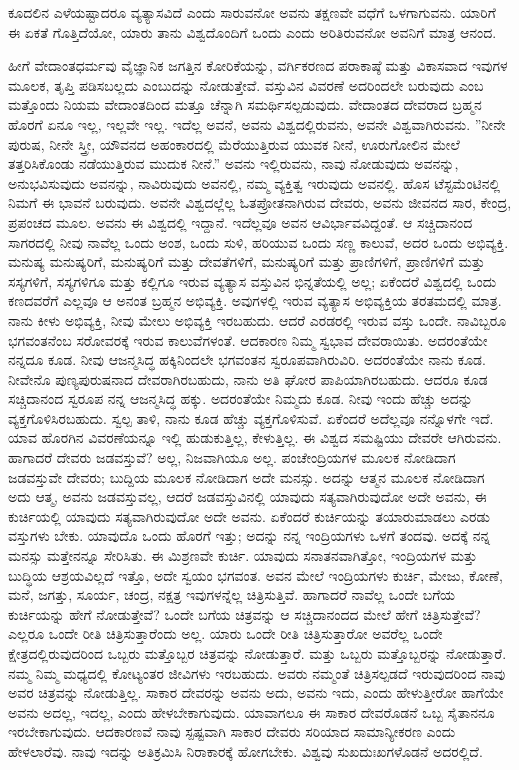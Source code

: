 ಕೂದಲಿನ ಎಳೆಯಷ್ಟಾದರೂ ವ್ಯತ್ಯಾಸವಿದೆ ಎಂದು ಸಾರುವನೋ ಅವನು ತಕ್ಷಣವೇ ವಧೆಗೆ ಒಳಗಾಗುವನು. ಯಾರಿಗೆ ಈ ಏಕತೆ ಗೊತ್ತಿದೆಯೋ, ಯಾರು ತಾನು ವಿಶ್ವದೊಂದಿಗೆ ಒಂದು ಎಂದು ಅರಿತಿರುವನೋ ಅವನಿಗೆ ಮಾತ್ರ ಆನಂದ.

ಹೀಗೆ ವೇದಾಂತಧರ್ಮವು ವೈಜ್ಞಾನಿಕ ಜಗತ್ತಿನ ಕೋರಿಕೆಯನ್ನು, ವರ್ಗಿಕರಣದ ಪರಾಕಾಷ್ಠೆ ಮತ್ತು ವಿಕಾಸವಾದ ಇವುಗಳ ಮೂಲಕ, ತೃಪ್ತಿ ಪಡಿಸಬಲ್ಲದು ಎಂಬುದನ್ನು ನೋಡುತ್ತೇವೆ. ವಸ್ತುವಿನ ವಿವರಣೆ ಅದರಿಂದಲೇ ಬರುವುದು ಎಂಬ ಮತ್ತೊಂದು ನಿಯಮ ವೇದಾಂತದಿಂದ ಮತ್ತೂ ಚೆನ್ನಾಗಿ ಸಮರ್ಥಿಸಲ್ಪಡುವುದು. ವೇದಾಂತದ ದೇವರಾದ ಬ್ರಹ್ಮನ ಹೊರಗೆ ಏನೂ ಇಲ್ಲ, ಇಲ್ಲವೇ ಇಲ್ಲ. ಇದೆಲ್ಲ ಅವನೆ, ಅವನು ವಿಶ್ವದಲ್ಲಿರುವನು, ಅವನೇ ವಿಶ್ವವಾಗಿರುವನು. ''ನೀನೇ ಪುರುಷ, ನೀನೇ ಸ್ತ್ರೀ, ಯೌವನದ ಅಹಂಕಾರದಲ್ಲಿ ಮೆರೆಯುತ್ತಿರುವ ಯುವಕ ನೀನೆ, ಊರುಗೋಲಿನ ಮೇಲೆ ತತ್ತರಿಸಿಕೊಂಡು ನಡೆಯುತ್ತಿರುವ ಮುದುಕ ನೀನೆ.” ಅವನು ಇಲ್ಲಿರುವನು, ನಾವು ನೋಡುವುದು ಅವನನ್ನು, ಅನುಭವಿಸುವುದು ಅವನನ್ನು, ನಾವಿರುವುದು ಅವನಲ್ಲಿ, ನಮ್ಮ ವ್ಯಕ್ತಿತ್ವ ಇರುವುದು ಅವನಲ್ಲಿ. ಹೊಸ ಟೆಸ್ಟಮೆಂಟಿನಲ್ಲಿ ನಿಮಗೆ ಈ ಭಾವನೆ ಬರುವುದು. ಅವನೇ ವಿಶ್ವದಲ್ಲೆಲ್ಲ ಓತಪ್ರೋತನಾಗಿರುವ ದೇವರು, ಅವನು ಜೀವನದ ಸಾರ, ಕೇಂದ್ರ, ಪ್ರಪಂಚದ ಮೂಲ. ಅವನು ಈ ವಿಶ್ವದಲ್ಲಿ ಇದ್ದಾನೆ. ಇದೆಲ್ಲವೂ ಅವನ ಆವಿರ್ಭಾವವಿದ್ದಂತೆ. ಆ ಸಚ್ಚಿದಾನಂದ ಸಾಗರದಲ್ಲಿ ನೀವು ನಾವೆಲ್ಲ ಒಂದು ಅಂಶ, ಒಂದು ಸುಳಿ, ಹರಿಯುವ ಒಂದು ಸಣ್ಣ ಕಾಲುವೆ, ಅದರ ಒಂದು ಅಭಿವ್ಯಕ್ತಿ. ಮನುಷ್ಯ ಮನುಷ್ಯರಿಗೆ, ಮನುಷ್ಯರಿಗೆ ಮತ್ತು ದೇವತೆಗಳಿಗೆ, ಮನುಷ್ಯರಿಗೆ ಮತ್ತು ಪ್ರಾಣಿಗಳಿಗೆ, ಪ್ರಾಣಿಗಳಿಗೆ ಮತ್ತು ಸಸ್ಯಗಳಿಗೆ, ಸಸ್ಯಗಳಿಗೂ ಮತ್ತು ಕಲ್ಲಿಗೂ ಇರುವ ವ್ಯತ್ಯಾಸ ವಸ್ತುವಿನ ಭಿನ್ನತೆಯಲ್ಲಿ ಅಲ್ಲ; ಏಕೆಂದರೆ ವಿಶ್ವದಲ್ಲಿ ಒಂದು ಕಣದವರೆಗೆ ಎಲ್ಲವೂ ಆ ಅನಂತ ಬ್ರಹ್ಮನ ಅಭಿವ್ಯಕ್ತಿ. ಅವುಗಳಲ್ಲಿ ಇರುವ ವ್ಯತ್ಯಾಸ ಅಭಿವ್ಯಕ್ತಿಯ ತರತಮದಲ್ಲಿ ಮಾತ್ರ. ನಾನು ಕೀಳು ಅಭಿವ್ಯಕ್ತಿ, ನೀವು ಮೇಲು ಅಭಿವ್ಯಕ್ತಿ ಇರಬಹುದು. ಆದರೆ ಎರಡರಲ್ಲಿ ಇರುವ ವಸ್ತು ಒಂದೇ. ನಾವಿಬ್ಬರೂ ಭಗವಂತನೆಂಬ ಸರೋವರಕ್ಕೆ ಇರುವ ಕಾಲುವೆಗಳಂತೆ. ಆದಕಾರಣ ನಿಮ್ಮ ಸ್ವಭಾವ ದೇವರಾಯಿತು. ಅದರಂತೆಯೇ ನನ್ನದೂ ಕೂಡ. ನೀವು ಆಜನ್ಮಸಿದ್ಧ ಹಕ್ಕಿನಿಂದಲೇ ಭಗವಂತನ ಸ್ವರೂಪವಾಗಿರುವಿರಿ. ಅದರಂತೆಯೇ ನಾನು ಕೂಡ. ನೀವೇನೊ ಪುಣ್ಯಪುರುಷನಾದ ದೇವರಾಗಿರಬಹುದು, ನಾನು ಅತಿ ಘೋರ ಪಾಪಿಯಾಗಿರಬಹುದು. ಆದರೂ ಕೂಡ ಸಚ್ಚಿದಾನಂದ ಸ್ವರೂಪ ನನ್ನ ಆಜನ್ಮಸಿದ್ಧ ಹಕ್ಕು. ಅದರಂತೆಯೇ ನಿಮ್ಮದು ಕೂಡ. ನೀವು ಇಂದು ಹೆಚ್ಚು ಅದನ್ನು ವ್ಯಕ್ತಗೊಳಿಸಿರಬಹುದು. ಸ್ವಲ್ಪ ತಾಳಿ, ನಾನು ಕೂಡ ಹೆಚ್ಚು ವ್ಯಕ್ತಗೊಳಿಸುವೆ. ಏಕೆಂದರೆ ಅದೆಲ್ಲವೂ ನನ್ನೊಳಗೇ ಇದೆ. ಯಾವ ಹೊರಗಿನ ವಿವರಣೆಯನ್ನೂ ಇಲ್ಲಿ ಹುಡುಕುತ್ತಿಲ್ಲ, ಕೇಳುತ್ತಿಲ್ಲ. ಈ ವಿಶ್ವದ ಸಮಷ್ಟಿಯು ದೇವರೇ ಆಗಿರುವನು. ಹಾಗಾದರೆ ದೇವರು ಜಡವಸ್ತುವೆ? ಅಲ್ಲ, ನಿಜವಾಗಿಯೂ ಅಲ್ಲ. ಪಂಚೇಂದ್ರಿಯಗಳ ಮೂಲಕ ನೋಡಿದಾಗ ಜಡವಸ್ತುವೇ ದೇವರು; ಬುದ್ದಿಯ ಮೂಲಕ ನೋಡಿದಾಗ ಅದೇ ಮನಸ್ಸು. ಅದನ್ನು ಆತ್ಮನ ಮೂಲಕ ನೋಡಿದಾಗ ಅದು ಆತ್ಮ, ಅವನು ಜಡವಸ್ತುವಲ್ಲ, ಆದರೆ ಜಡವಸ್ತುವಿನಲ್ಲಿ ಯಾವುದು ಸತ್ಯವಾಗಿರುವುದೋ ಅದೇ ಅವನು, ಈ ಕುರ್ಚಿಯಲ್ಲಿ ಯಾವುದು ಸತ್ಯವಾಗಿರುವುದೋ ಅದೇ ಅವನು. ಏಕೆಂದರೆ ಕುರ್ಚಿಯನ್ನು ತಯಾರುಮಾಡಲು ಎರಡು ವಸ್ತುಗಳು ಬೇಕು. ಯಾವುದೊ ಒಂದು ಹೊರಗೆ ಇತ್ತು; ಅದನ್ನು ನನ್ನ ಇಂದ್ರಿಯಗಳು ಒಳಗೆ ತಂದವು. ಅದಕ್ಕೆ ನನ್ನ ಮನಸ್ಸು ಮತ್ತೇನನ್ನೂ ಸೇರಿಸಿತು. ಈ ಮಿಶ್ರಣವೇ ಕುರ್ಚಿ. ಯಾವುದು ಸನಾತನವಾಗಿತ್ತೋ, ಇಂದ್ರಿಯಗಳ ಮತ್ತು ಬುದ್ಧಿಯ ಆಶ್ರಯವಿಲ್ಲದೆ ಇತ್ತೊ, ಅದೇ ಸ್ವಯಂ ಭಗವಂತ. ಅವನ ಮೇಲೆ ಇಂದ್ರಿಯಗಳು ಕುರ್ಚಿ, ಮೇಜು, ಕೋಣೆ, ಮನೆ, ಜಗತ್ತು, ಸೂರ್ಯ, ಚಂದ್ರ, ನಕ್ಷತ್ರ ಇವುಗಳನ್ನೆಲ್ಲ ಚಿತ್ರಿಸುತ್ತಿವೆ. ಹಾಗಾದರೆ ನಾವೆಲ್ಲ ಒಂದೇ ಬಗೆಯ ಕುರ್ಚಿಯನ್ನು ಹೇಗೆ ನೋಡುತ್ತೇವೆ? ಒಂದೇ ಬಗೆಯ ಚಿತ್ರವನ್ನು ಆ ಸಚ್ಚಿದಾನಂದದ ಮೇಲೆ ಹೇಗೆ ಚಿತ್ರಿಸುತ್ತೇವೆ? ಎಲ್ಲರೂ ಒಂದೇ ರೀತಿ ಚಿತ್ರಿಸುತ್ತಾರೆಂದು ಅಲ್ಲ. ಯಾರು ಒಂದೇ ರೀತಿ ಚಿತ್ರಿಸುತ್ತಾರೋ ಅವರೆಲ್ಲ ಒಂದೇ ಕ್ಷೇತ್ರದಲ್ಲಿರುವುದರಿಂದ ಒಬ್ಬರು ಮತ್ತೊಬ್ಬರ ಚಿತ್ರವನ್ನು ನೋಡುತ್ತಾರೆ. ಮತ್ತು ಒಬ್ಬರು ಮತ್ತೊಬ್ಬರನ್ನು ನೋಡುತ್ತಾರೆ. ನಮ್ಮ ನಿಮ್ಮ ಮಧ್ಯದಲ್ಲಿ ಕೋಟ್ಯಂತರ ಜೀವಿಗಳು ಇರಬಹುದು. ಅವರು ನಮ್ಮಂತೆ ಚಿತ್ರಿಸಲ್ಪಡದೆ ಇರುವುದರಿಂದ ನಾವು ಅವರ ಚಿತ್ರವನ್ನು ನೋಡುತ್ತಿಲ್ಲ. ಸಾಕಾರ ದೇವರನ್ನು ಅವನು ಅದು, ಅವನು ಇದು, ಎಂದು ಹೇಳುತ್ತೀರೋ ಹಾಗೆಯೇ ಅವನು ಅದಲ್ಲ, ಇದಲ್ಲ, ಎಂದು ಹೇಳಬೇಕಾಗುವುದು. ಯಾವಾಗಲೂ ಈ ಸಾಕಾರ ದೇವರೊಡನೆ ಒಬ್ಬ ಸೈತಾನನೂ ಇರಬೇಕಾಗುವುದು. ಆದಕಾರಣವೆ ನಾವು ಸ್ಪಷ್ಟವಾಗಿ ಸಾಕಾರ ದೇವರು ಸರಿಯಾದ ಸಾಮಾನ್ಯೀಕರಣ ಎಂದು ಹೇಳಲಾರೆವು. ನಾವು ಇದನ್ನು ಅತಿಕ್ರಮಿಸಿ ನಿರಾಕಾರಕ್ಕೆ ಹೋಗಬೇಕು. ವಿಶ್ವವು ಸುಖದುಃಖಗಳೊಡನೆ ಅದರಲ್ಲಿದೆ. 